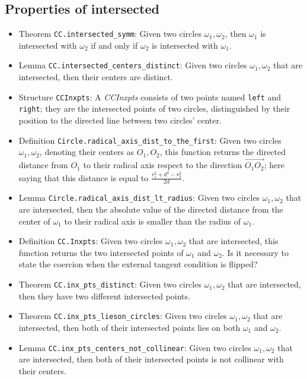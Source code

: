 \documentclass[12pt]{amsart}
\begin{document}
\subsection{Properties of intersected}
\begin{itemize}
    \item Theorem \verb|CC.intersected_symm|: Given two circles $\omega_1,\omega_2$, then $\omega_1$ is intersected with $\omega_2$ if and only if $\omega_2$ is intersected with $\omega_1$.
    \item Lemma \verb|CC.intersected_centers_distinct|: Given two circles $\omega_1,\omega_2$ that are intersected, then their centers are distinct.
    \item Structure \verb|CCInxpts|: A \emph{CCInxpts} consists of two points named \verb|left| and \verb|right|; they are the intersected points of two circles, distinguished by their position to the directed line between two circles' center.
    \item Definition \verb|Circle.radical_axis_dist_to_the_first|: Given two circles $\omega_1,\omega_2$, denoting their centers as $O_1,O_2$, this function returns the directed distance from $O_1$ to their radical axis respect to the direction $\overrightarrow{O_1O_2}$; here saying that this distance is equal to $\frac{r_1^2+d^2-r_2^2}{2d}$.
    \item Lemma \verb|Circle.radical_axis_dist_lt_radius|: Given two circles $\omega_1,\omega_2$ that are intersected, then the absolute value of the directed distance from the center of $\omega_1$ to their radical axis is smaller than the radius of $\omega_1$.
    \item Definition \verb|CC.Inxpts|: Given two circles $\omega_1,\omega_2$ that are intersected, this function returns the two intersected points of $\omega_1$ and $\omega_2$. {\color{red} Is it necessary to state the coercion when the external tangent condition is flipped?}
    \item Theorem \verb|CC.inx_pts_distinct|: Given two circles $\omega_1,\omega_2$ that are intersected, then they have two different intersected points.
    \item Theorem \verb|CC.inx_pts_lieson_circles|: Given two circles $\omega_1,\omega_2$ that are intersected, then both of their intersected points lies on both $\omega_1$ and $\omega_2$.
    \item Lemma \verb|CC.inx_pts_centers_not_collinear|: Given two circles $\omega_1,\omega_2$ that are intersected, then both of their intersected points is not collinear with their centers.

\end{itemize}
\end{document}
